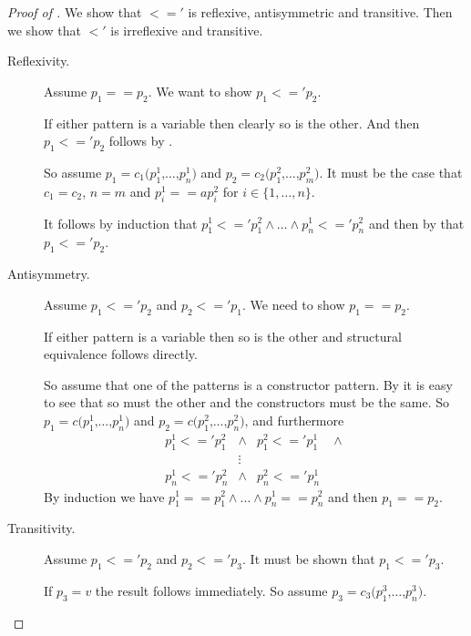 \begin{proof}[Proof of {}]
  We show that $<='$ is reflexive, antisymmetric and transitive. Then we show
  that $<'$ is irreflexive and transitive.
  \begin{description}
  \item[Reflexivity.]
    Assume $p_1 == p_2$. We want to show $p_1 <=' p_2$.

    If either pattern is a variable then clearly so is the other. And then $p_1
    <=' p_2$ follows by .

    So assume $p_1 = c_1 \texttt{(} p^1_1 \texttt{,} \ldots \texttt{,} p^1_n
    \texttt{)}$ and $p_2 = c_2 \texttt{(} p^2_1 \texttt{,} \ldots \texttt{,}
    p^2_m \texttt{)}$. It must be the case that $c_1 = c_2$, $n = m$ and $p^1_i
    ==a p^2_i$ for $i \in \{1, \ldots, n\}$.

    It follows by induction that $p^1_1 <=' p^2_1 \land \ldots \land p^1_n <='
    p^2_n$ and then by  that $p_1 <=' p_2$.

  \item[Antisymmetry.]
    Assume $p_1 <=' p_2$ and $p_2 <=' p_1$. We need to show $p_1 == p_2$.

    If either pattern is a variable then so is the other and structural
    equivalence follows directly.

    So assume that one of the patterns is a constructor pattern. By
     it is easy to see that so must the other
    and the constructors must be the same. So $p_1 = c \texttt{(} p^1_1
    \texttt{,} \ldots \texttt{,} p^1_n \texttt{)}$ and $p_2 = c \texttt{(} p^2_1
    \texttt{,} \ldots \texttt{,} p^2_n \texttt{)}$, and furthermore
    \begin{eqnarray*}
      p^1_1 <=' p^2_1 &\land& p^2_1 <=' p^1_1 \quad \land\\
      &\vdots&\\
      p^1_n <=' p^2_n &\land& p^2_n <=' p^1_n
    \end{eqnarray*}
    By induction we have $p^1_1 == p^2_1 \land \ldots \land p^1_n == p^2_n$ and
    then $p_1 == p_2$.

  \item[Transitivity.]
    Assume $p_1 <=' p_2$ and $p_2 <=' p_3$. It must be shown that $p_1 <=' p_3$.

    If $p_3 = v$ the result follows immediately. So assume $p_3 = c_3 \texttt{(}
    p^3_1 \texttt{,} \ldots \texttt{,} p^3_n \texttt{)}$.


\end{description}
\end{proof}
